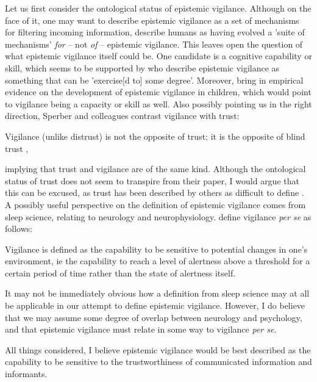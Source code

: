 Let us first consider the ontological status of epistemic vigilance. Although on the face of it, one may want to describe epistemic vigilance as a set of mechanisms for filtering incoming information, \citet{Sperber10} describe humans as having evolved a 'suite of mechanisms' \emph{for} -- not \emph{of} -- epistemic vigilance. This leaves open the question of what epistemic vigilance itself could be. One candidate is a cognitive capability or skill, which seems to be supported by \citet[p.~60]{MS11} who describe epistemic vigilance as something that can be 'exercise[d to] some degree'. Moreover, \citet[\S 5]{Sperber10} bring in empirical evidence on the development of epistemic vigilance in children, which would point to vigilance being a capacity or skill as well.
Also possibly pointing us in the right direction, Sperber and colleagues contrast vigilance with trust:
\begin{quoting}
    Vigilance (unlike distrust) is not the opposite of trust; it is the opposite
of blind trust
    \hfill \citep[p.~363]{Sperber10},
\end{quoting}
 implying that trust and vigilance are of the same kind. Although the ontological status of trust does not seem to transpire from their \citeyear{Sperber10} paper, I would argue that this can be excused, as trust has been described by others as difficult to define \citep{Simpson12,McKnight00}.
A possibly useful perspective on the definition of epistemic vigilance comes from sleep science, relating to neurology and neurophysiology. \citet{VanSchie21} define vigilance \emph{per se} as follows:
\begin{quoting}
    Vigilance is defined as the capability to be sensitive to potential changes in one's environment, ie the capability to reach a level of alertness above a threshold for a certain period of time rather than the state of alertness itself.
    \hfill \citep[p.~175]{VanSchie21}
\end{quoting}
It may not be immediately obvious how a definition from sleep science may at all be applicable in our attempt to define epistemic vigilance. However, I do believe that we may assume some degree of overlap between neurology and psychology, and that epistemic vigilance must relate in some way to vigilance \emph{per se}.

All things considered, I believe epistemic vigilance would be best described as the capability to be sensitive to the trustworthiness of communicated information and informants.

